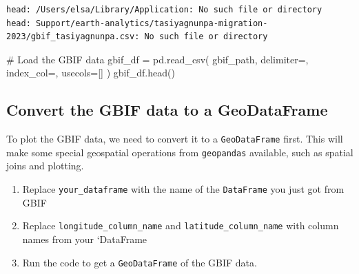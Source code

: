 \documentclass[
  letterpaper,
  DIV=11,
  numbers=noendperiod,
  oneside]{scrreprt}
\newenvironment{Shaded}{\begin{snugshade}}{\end{snugshade}}
\newcommand{\CommentTok}[1]{\textcolor[rgb]{0.37,0.37,0.37}{#1}}
\newcommand{\NormalTok}[1]{\textcolor[rgb]{0.00,0.23,0.31}{#1}}
\newcommand{\OperatorTok}[1]{\textcolor[rgb]{0.37,0.37,0.37}{#1}}
\newcommand{\StringTok}[1]{\textcolor[rgb]{0.13,0.47,0.30}{#1}}
\providecommand{\tightlist}{%
  \setlength{\itemsep}{0pt}\setlength{\parskip}{0pt}}
\begin{document}
\begin{verbatim}
head: /Users/elsa/Library/Application: No such file or directory
head: Support/earth-analytics/tasiyagnunpa-migration-2023/gbif_tasiyagnunpa.csv: No such file or directory
\end{verbatim}

\begin{Shaded}
\begin{Highlighting}[]
\CommentTok{\# Load the GBIF data}
\NormalTok{gbif\_df }\OperatorTok{=}\NormalTok{ pd.read\_csv(}
\NormalTok{    gbif\_path, }
\NormalTok{    delimiter}\OperatorTok{=}\StringTok{\textquotesingle{}\textquotesingle{}}\NormalTok{,}
\NormalTok{    index\_col}\OperatorTok{=}\StringTok{\textquotesingle{}\textquotesingle{}}\NormalTok{,}
\NormalTok{    usecols}\OperatorTok{=}\NormalTok{[]}
\NormalTok{)}
\NormalTok{gbif\_df.head()}
\end{Highlighting}
\end{Shaded}

\subsection{Convert the GBIF data to a
GeoDataFrame}\label{convert-the-gbif-data-to-a-geodataframe}

To plot the GBIF data, we need to convert it to a \texttt{GeoDataFrame}
first. This will make some special geospatial operations from
\texttt{geopandas} available, such as spatial joins and plotting.

\begin{tcolorbox}[enhanced jigsaw, colbacktitle=quarto-callout-color!10!white, opacityback=0, bottomtitle=1mm, toptitle=1mm, bottomrule=.15mm, left=2mm, colframe=quarto-callout-color-frame, leftrule=.75mm, opacitybacktitle=0.6, colback=white, rightrule=.15mm, toprule=.15mm, breakable, titlerule=0mm, title=\textcolor{quarto-callout-color}{\faInfo}\hspace{0.5em}{Try It: Convert `DataFrame` to `GeoDataFrame`}, coltitle=black, arc=.35mm]

\begin{enumerate}
\def\labelenumi{\arabic{enumi}.}
\tightlist
\item
  Replace \texttt{your\_dataframe} with the name of the
  \texttt{DataFrame} you just got from GBIF
\item
  Replace \texttt{longitude\_column\_name} and
  \texttt{latitude\_column\_name} with column names from your `DataFrame
\item
  Run the code to get a \texttt{GeoDataFrame} of the GBIF data.
\end{enumerate}

\end{tcolorbox}
\end{document}
